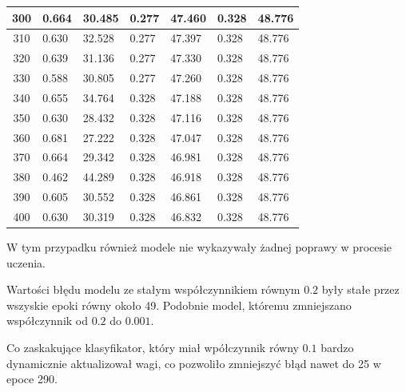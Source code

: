 \documentclass{report}
\begin{document}
\begin{minipage}{\textwidth}
\begin{longtable}{|c|l|l|l|l|l|l|}
                     300 & 0.664 & 30.485 & 0.277 & 47.460 & 0.328 & 48.776 \\ \hline
                     310 & 0.630 & 32.528 & 0.277 & 47.397 & 0.328 & 48.776 \\ \hline
                     320 & 0.639 & 31.136 & 0.277 & 47.330 & 0.328 & 48.776 \\ \hline
                     330 & 0.588 & 30.805 & 0.277 & 47.260 & 0.328 & 48.776 \\ \hline
                     340 & 0.655 & 34.764 & 0.328 & 47.188 & 0.328 & 48.776 \\ \hline
                     350 & 0.630 & 28.432 & 0.328 & 47.116 & 0.328 & 48.776 \\ \hline
                     360 & 0.681 & 27.222 & 0.328 & 47.047 & 0.328 & 48.776 \\ \hline
                     370 & 0.664 & 29.342 & 0.328 & 46.981 & 0.328 & 48.776 \\ \hline
                     380 & 0.462 & 44.289 & 0.328 & 46.918 & 0.328 & 48.776 \\ \hline
                     390 & 0.605 & 30.552 & 0.328 & 46.861 & 0.328 & 48.776 \\ \hline
                     400 & 0.630 & 30.319 & 0.328 & 46.832 & 0.328 & 48.776 \\ \hline
                 \end{longtable}
    \end{minipage}


    W tym przypadku również modele nie wykazywały żadnej poprawy w procesie uczenia.

    Wartości błędu modelu ze stałym współczynnikiem równym $0.2$ były stałe przez wszyskie epoki równy około 49.
    Podobnie model, któremu zmniejszano współczynnik od $0.2$ do $0.001$.

    Co zaskakujące klasyfikator, który miał wpółczynnik równy $0.1$ bardzo dynamicznie aktualizował wagi, co pozwoliło zmniejszyć błąd nawet do 25 w epoce 290.
\end{document}
